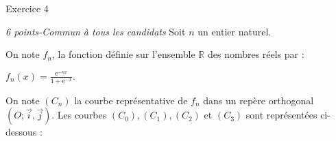 
%
\begin{h2}Exercice 4\end{h2}
\textit{6 points-Commun à tous les candidats}
Soit $n$ un entier naturel.
\par
On note $f_{n}$, la fonction définie sur l'ensemble $\mathbb{R}$ des nombres réels par :
\par
$f_{n}\left(x\right)=\frac{\text{e}^{-nx}}{1+\text{e}^{-x}}.$
\par
On note $\left(C_{n}\right)$ la courbe représentative de $f_{n}$ dans un repère orthogonal $\left(O; \vec{i}, \vec{j}\right)$. Les courbes $\left(C_{0}\right),\left(C_{1}\right),\left(C_{2}\right)$ et $\left(C_{3}\right)$ sont représentées ci-dessous :


